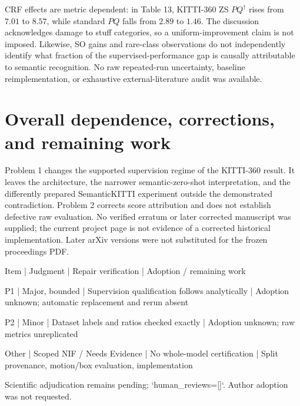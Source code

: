 \documentclass[10pt]{article}
\begin{document}
CRF effects are metric dependent: in Table 13, KITTI-360 ZS \(PQ^\dagger\) rises from \(7.01\) to \(8.57\), while standard \(PQ\) falls from \(2.89\) to \(1.46\). The discussion acknowledges damage to stuff categories, so a uniform-improvement claim is not imposed. Likewise, SO gains and rare-class observations do not independently identify what fraction of the supervised-performance gap is causally attributable to semantic recognition. No raw repeated-run uncertainty, baseline reimplementation, or exhaustive external-literature audit was available.\par
\section*{Overall dependence, corrections, and remaining work}
Problem 1 changes the supported supervision regime of the KITTI-360 result. It leaves the architecture, the narrower semantic-zero-shot interpretation, and the differently prepared SemanticKITTI experiment outside the demonstrated contradiction. Problem 2 corrects score attribution and does not establish defective raw evaluation. No verified erratum or later corrected manuscript was supplied; the current project page is not evidence of a corrected historical implementation. Later arXiv versions were not substituted for the frozen proceedings PDF.\par
Item | Judgment | Repair verification | Adoption / remaining work\par
P1 | Major, bounded | Supervision qualification follows analytically | Adoption unknown; automatic replacement and rerun absent\par
P2 | Minor | Dataset labels and ratios checked exactly | Adoption unknown; raw metrics unreplicated\par
Other | Scoped NIF / Needs Evidence | No whole-model certification | Split provenance, motion/box evaluation, implementation\par
Scientific adjudication remains pending; `human\_reviews=[]`. Author adoption was not requested.\par
\end{document}
